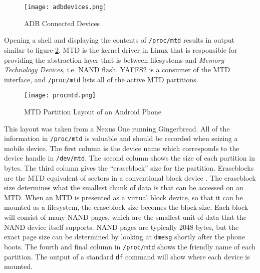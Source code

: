 \begin{figure}[ht]
\caption{ADB Connected Devices}
\begin{center}\texttt{[image: adbdevices.png]}\end{center}
\label{fig:adbdevices}
\end{figure}

Opening a shell and displaying the contents of \texttt{/proc/mtd} results in output similar to figure \ref{fig:mtd}.  MTD is the
kernel driver in Linux that is responsible for providing the abstraction layer that is between filesystems and \emph{Memory
Technology Devices}, i.e. NAND flash. YAFFS2 is a consumer of the MTD interface, and \texttt{/proc/mtd} lists all of the active MTD
partitions. 

\begin{figure}[ht]
\caption{MTD Partition Layout of an Android Phone}
\begin{center}\texttt{[image: procmtd.png]}\end{center}
\label{fig:mtd}
\end{figure}	

This layout was taken from a Nexus One running Gingerbread.  All of the information in \texttt{/proc/mtd} is valuable and should be
recorded when seizing a mobile device. The first column is the device name which corresponds to the device handle in
\texttt{/dev/mtd}.  The second column shows the size of each partition in bytes. 
The third column gives the ``eraseblock'' size for the partition.  Eraseblocks are the MTD equivalent of sectors in a conventional block
device \cite{mtdfaq}. The eraseblock size determines what the smallest chunk of data is that can be accessed on an MTD.  When an MTD
is presented as a virtual block device, so that it can be mounted as a filesystem, the eraseblock size becomes the block size.  Each
block will consist of many NAND pages, which are the smallest unit of data that the NAND device itself supports.  NAND pages are
typically 2048 bytes, but the exact page size can be determined by looking at \texttt{dmesg} shortly after the phone boots.  The
fourth and final column in \texttt{/proc/mtd} shows the friendly name of each partition.  The output of a standard \texttt{df}
command will show where each device is mounted.

